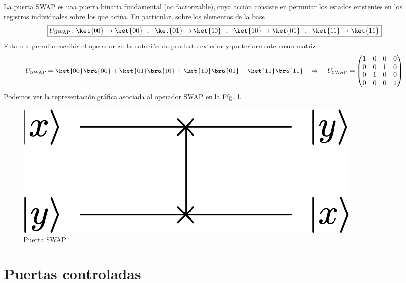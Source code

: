 \documentclass[a4paper,11pt]{book} %
\numberwithin{equation}{chapter}
\def\lp{\left(}
\def\rp{\right)}
\def\rqa{\quad \Rightarrow \quad}
\begin{document}
La puerta SWAP es una puerta binaria fundamental (no factorizable), cuya acción consiste en permutar los estados existentes en los registros individuales sobre los que actúa. En particular, sobre los elementos de la base
	\begin{equation}
	\boxed{U_{\rm SWAP }: \ket{00}\to\ket{00}~~,~~\ket{01}\to\ket{10}~~,~~\ket{10}\to\ket{01}~~,~~ 	\ket{11}\to\ket{11} }
	\end{equation}
Esto nos permite escribir el operador en la notación de producto exterior y posteriormente como matriz
	\begin{equation}
	U_{\rm SWAP } = \ket{00}\bra{00} + \ket{01}\bra{10} + \ket{10}\bra{01} +\ket{11}\bra{11}  \rqa	
	U_{\rm SWAP} = \lp \begin{matrix} 1 & 0 & 0 & 0 \\ 0 & 0 & 1 & 0 \\ 0 & 1 & 0 & 0 \\ 0 & 0 & 0 & 1 \end{matrix} \rp
	\end{equation}
Podemos ver la representación gráfica asociada al operador SWAP en la Fíg. \ref{Fig_multiqubit_SWAP_gate}.

	\begin{figure}[H]
	\centering 
	\includegraphics[width=0.23\linewidth]{Figuras/Fig_multiqubit_SWAP_gate.png}
	\caption{Puerta SWAP}
	\label{Fig_multiqubit_SWAP_gate}
	\end{figure}

    \section{Puertas controladas}
    
\end{document}
